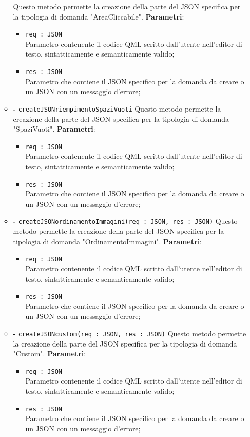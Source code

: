 \begin{itemize}
\begin{itemize}
		Questo metodo permette la creazione della parte del JSON specifica per la tipologia di domanda "AreaCliccabile".
		\textbf{Parametri}:
		\begin{itemize}
			\item \texttt{req : JSON} \\
			Parametro contenente il codice QML scritto dall'utente nell'editor di testo, sintatticamente e semanticamente valido;
			\item \texttt{res : JSON} \\
			Parametro che contiene il JSON specifico per la domanda da creare o un JSON con un messaggio d'errore;
		\end{itemize}
		\item \textbf{-} \texttt{createJSONriempimentoSpaziVuoti}
		Questo metodo permette la creazione della parte del JSON specifica per la tipologia di domanda "SpaziVuoti".
		\textbf{Parametri}:
		\begin{itemize}
			\item \texttt{req : JSON} \\
			Parametro contenente il codice QML scritto dall'utente nell'editor di testo, sintatticamente e semanticamente valido;
			\item \texttt{res : JSON} \\
			Parametro che contiene il JSON specifico per la domanda da creare o un JSON con un messaggio d'errore;
		\end{itemize}
		\item \textbf{-} \texttt{createJSONordinamentoImmagini(req : JSON, res : JSON)}
		Questo metodo permette la creazione della parte del JSON specifica per la tipologia di domanda "OrdinamentoImmagini".
		\textbf{Parametri}:
		\begin{itemize}
			\item \texttt{req : JSON} \\
			Parametro contenente il codice QML scritto dall'utente nell'editor di testo, sintatticamente e semanticamente valido;
			\item \texttt{res : JSON} \\
			Parametro che contiene il JSON specifico per la domanda da creare o un JSON con un messaggio d'errore;
		\end{itemize}
		\item \textbf{-} \texttt{createJSONcustom(req : JSON, res : JSON)}
		Questo metodo permette la creazione della parte del JSON specifica per la tipologia di domanda "Custom".
		\textbf{Parametri}:
		\begin{itemize}
			\item \texttt{req : JSON} \\
			Parametro contenente il codice QML scritto dall'utente nell'editor di testo, sintatticamente e semanticamente valido;
			\item \texttt{res : JSON} \\
			Parametro che contiene il JSON specifico per la domanda da creare o un JSON con un messaggio d'errore;
		\end{itemize}
	\end{itemize}
\end{itemize}

